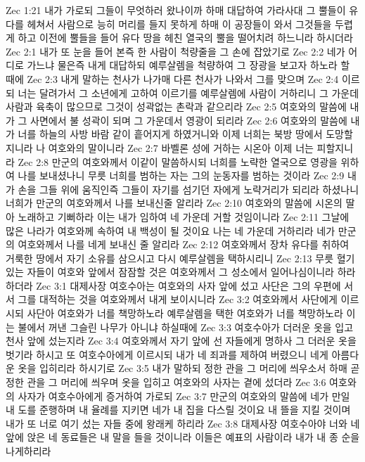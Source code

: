 Zec 1:21  내가 가로되 그들이 무엇하러 왔나이까 하매 대답하여 가라사대 그 뿔들이 유다를 헤쳐서 사람으로 능히 머리를 들지 못하게 하매 이 공장들이 와서 그것들을 두렵게 하고 이전에 뿔들을 들어 유다 땅을 헤친 열국의 뿔을 떨어치려 하느니라 하시더라
Zec 2:1  내가 또 눈을 들어 본즉 한 사람이 척량줄을 그 손에 잡았기로
Zec 2:2  네가 어디로 가느냐 물은즉 내게 대답하되 예루살렘을 척량하여 그 장광을 보고자 하노라 할 때에
Zec 2:3  내게 말하는 천사가 나가매 다른 천사가 나와서 그를 맞으며
Zec 2:4  이르되 너는 달려가서 그 소년에게 고하여 이르기를 예루살렘에 사람이 거하리니 그 가운데 사람과 육축이 많으므로 그것이 성곽없는 촌락과 같으리라
Zec 2:5  여호와의 말씀에 내가 그 사면에서 불 성곽이 되며 그 가운데서 영광이 되리라
Zec 2:6  여호와의 말씀에 내가 너를 하늘의 사방 바람 같이 흩어지게 하였거니와 이제 너희는 북방 땅에서 도망할지니라 나 여호와의 말이니라
Zec 2:7  바벨론 성에 거하는 시온아 이제 너는 피할지니라
Zec 2:8  만군의 여호와께서 이같이 말씀하시되 너희를 노략한 열국으로 영광을 위하여 나를 보내셨나니 무릇 너희를 범하는 자는 그의 눈동자를 범하는 것이라
Zec 2:9  내가 손을 그들 위에 움직인즉 그들이 자기를 섬기던 자에게 노략거리가 되리라 하셨나니 너희가 만군의 여호와께서 나를 보내신줄 알리라
Zec 2:10  여호와의 말씀에 시온의 딸아 노래하고 기뻐하라 이는 내가 임하여 네 가운데 거할 것임이니라
Zec 2:11  그날에 많은 나라가 여호와께 속하여 내 백성이 될 것이요 나는 네 가운데 거하리라 네가 만군의 여호와께서 나를 네게 보내신 줄 알리라
Zec 2:12  여호와께서 장차 유다를 취하여 거룩한 땅에서 자기 소유를 삼으시고 다시 예루살렘을 택하시리니
Zec 2:13  무릇 혈기 있는 자들이 여호와 앞에서 잠잠할 것은 여호와께서 그 성소에서 일어나심이니라 하라 하더라
Zec 3:1  대제사장 여호수아는 여호와의 사자 앞에 섰고 사단은 그의 우편에 서서 그를 대적하는 것을 여호와께서 내게 보이시니라
Zec 3:2  여호와께서 사단에게 이르시되 사단아 여호와가 너를 책망하노라 예루살렘을 택한 여호와가 너를 책망하노라 이는 불에서 꺼낸 그슬린 나무가 아니냐 하실때에
Zec 3:3  여호수아가 더러운 옷을 입고 천사 앞에 섰는지라
Zec 3:4  여호와께서 자기 앞에 선 자들에게 명하사 그 더러운 옷을 벗기라 하시고 또 여호수아에게 이르시되 내가 네 죄과를 제하여 버렸으니 네게 아름다운 옷을 입히리라 하시기로
Zec 3:5  내가 말하되 정한 관을 그 머리에 씌우소서 하매 곧 정한 관을 그 머리에 씌우며 옷을 입히고 여호와의 사자는 곁에 섰더라
Zec 3:6  여호와의 사자가 여호수아에게 증거하여 가로되
Zec 3:7  만군의 여호와의 말씀에 네가 만일 내 도를 준행하며 내 율례를 지키면 네가 내 집을 다스릴 것이요 내 뜰을 지킬 것이며 내가 또 너로 여기 섰는 자들 중에 왕래케 하리라
Zec 3:8  대제사장 여호수아야 너와 네 앞에 앉은 네 동료들은 내 말을 들을 것이니라 이들은 예표의 사람이라 내가 내 종 순을 나게하리라
